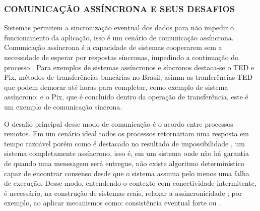 \subsubsection{COMUNICAÇÃO ASSÍNCRONA E SEUS DESAFIOS}

Sistemas  permitem a sincronização eventual dos dados para não impedir o funcionamento da aplicação, isso é um cenário de comunicação assíncrona. Comunicação assíncrona é a capacidade de sistemas cooperarem sem a necessidade de esperar por respostas síncronas, impedindo a continuação do processo \cite{yang2019synchronous}. Para exemplos de sistemas assíncronos e síncronos destaca-se o TED e Pix, métodos de transferências bancárias no Brasil; asimm as tranferências TED que podem demorar até horas para completar, como exemplo de sistema assíncrono; e o Pix, que é concluído dentro da operação de transferência, este é um exemplo de comunicação síncrona.

O desafio principal desse modo de comunicação é o acordo entre processos remotos. Em um cenário ideal todos os processos retornariam uma resposta em tempo razoável porém como é destacado no resultado de impossibilidade , um sistema completamente assíncrono, isso é, em um sistema onde não há garantia de quando uma menssagem será entregue, não existe algoritmo determinístico capaz de encontrar consenso desde que o sistema assuma pelo menos uma falha de execução. Desse modo, entendendo o contexto com conectividade intermitente, é necessário, na construção de sistemas reais, relaxar a assincronicidade \cite{FLP1985}; por exemplo, ao aplicar mecanismos como: consistência eventual forte \cite{Gomes2017VerifyingSEC} ou .

